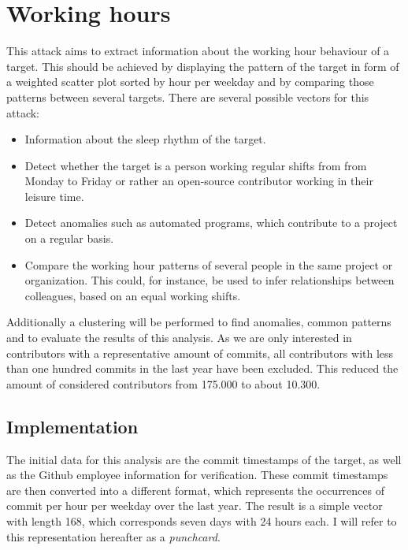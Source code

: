 \section{Working hours}

This attack aims to extract information about the working hour behaviour of a target.
This should be achieved by displaying the pattern of the target in form of a weighted scatter plot sorted by hour per weekday and by comparing those patterns between several targets.
There are several possible vectors for this attack:

\begin{itemize}
    \item Information about the sleep rhythm of the target.
    \item Detect whether the target is a person working regular shifts from from Monday to Friday or rather an open-source contributor working in their leisure time.
    \item Detect anomalies such as automated programs, which contribute to a project on a regular basis.
    \item Compare the working hour patterns of several people in the same project or organization. This could, for instance, be used to infer relationships between colleagues, based on an equal working shifts.
\end{itemize}

Additionally a clustering will be performed to find anomalies, common patterns and to evaluate the results of this analysis.
As we are only interested in contributors with a representative amount of commits, all contributors with less than one hundred commits in the last year have been excluded.
This reduced the amount of considered contributors from 175.000 to about 10.300.


\subsection{Implementation}\label{punchcard-implementation}

The initial data for this analysis are the commit timestamps of the target, as well as the Github employee information for verification.
These commit timestamps are then converted into a different format, which represents the occurrences of commit per hour per weekday over the last year.
The result is a simple vector with length 168, which corresponds seven days with 24 hours each.
I will refer to this representation hereafter as a \emph{punchcard}.

